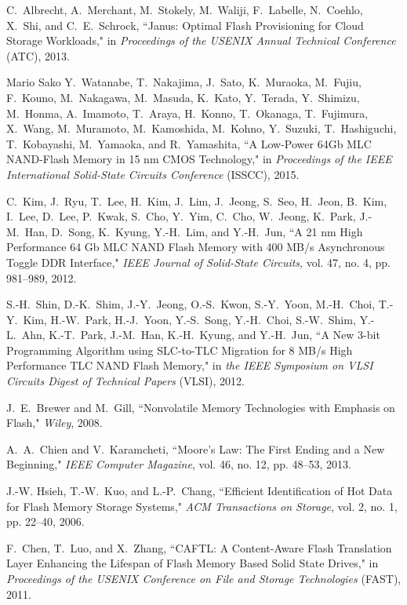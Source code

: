 \begin{thebibliography}{00}
C.~Albrecht, A.~Merchant, M.~Stokely, M.~Waliji, F.~Labelle, N.~Coehlo, X.~Shi, and C.~E.~Schrock,
``Janus: Optimal Flash Provisioning for Cloud Storage Workloads,"
in \emph{Proceedings of the USENIX Annual Technical Conference} (ATC), 2013.

Mario Sako
Y.~Watanabe, T.~Nakajima, J.~Sato, K.~Muraoka, M.~Fujiu, F.~Kouno, M.~Nakagawa, M.~Masuda, K.~Kato, Y.~Terada, Y.~Shimizu, M.~Honma, A.~Imamoto,  T.~Araya, H.~Konno, T.~Okanaga, T.~Fujimura, X.~Wang, M.~Muramoto, M.~Kamoshida, M.~Kohno, Y.~Suzuki, T.~Hashiguchi, T.~Kobayashi, M.~Yamaoka, and R.~Yamashita,
``A Low-Power 64Gb MLC NAND-Flash Memory in 15 nm CMOS Technology,"
in \emph{Proceedings of the IEEE International Solid-State Circuits Conference} (ISSCC), 2015.

C.~Kim, J.~Ryu, T.~Lee, H.~Kim, J.~Lim, J.~Jeong, S.~Seo, H.~Jeon, B.~Kim, I.~Lee, D.~Lee, P.~Kwak, S.~Cho, Y.~Yim, C.~Cho, W.~Jeong, K.~Park, J.-M.~Han, D.~Song, K.~Kyung, Y.-H.~Lim, and Y.-H.~Jun,
``A 21 nm High Performance 64 Gb MLC NAND Flash Memory with 400 MB/s Asynchronous Toggle DDR Interface,"
\emph{IEEE Journal of Solid-State Circuits}, vol. 47, no. 4, pp. 981--989, 2012.

S.-H.~Shin, D.-K.~Shim, J.-Y.~Jeong, O.-S.~Kwon, S.-Y.~Yoon, M.-H.~Choi, T.-Y.~Kim, H.-W.~Park, H.-J.~Yoon, Y.-S.~Song, Y.-H.~Choi, S.-W.~Shim, Y.-L.~Ahn, K.-T.~Park, J.-M.~Han, K.-H.~Kyung, and Y.-H.~Jun,
``A New 3-bit Programming Algorithm using SLC-to-TLC Migration for 8 MB/s High Performance TLC NAND Flash Memory,"
in \emph{the IEEE Symposium on VLSI Circuits Digest of Technical Papers} (VLSI), 2012.

J.~E.~Brewer and M.~Gill,
``Nonvolatile Memory Technologies with Emphasis on Flash,"
\emph{Wiley}, 2008.

A.~A.~Chien and V.~Karamcheti,
``Moore's Law: The First Ending and a New Beginning,"
\emph{IEEE Computer Magazine}, vol. 46, no. 12, pp. 48--53, 2013.

J.-W. Hsieh, T.-W.~Kuo, and L.-P.~Chang,
``Efficient Identification of Hot Data for Flash Memory Storage Systems,"
\textit{ACM Transactions on Storage}, vol. 2, no. 1, pp. 22--40, 2006.

F.~Chen, T.~Luo, and X.~Zhang,
``CAFTL: A Content-Aware Flash Translation Layer Enhancing the Lifespan of Flash Memory Based Solid State Drives,"
in \textit{Proceedings of the USENIX Conference on File and Storage Technologies} (FAST), 2011.


\end{thebibliography}
